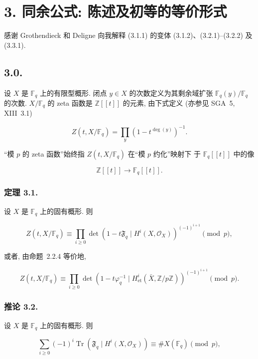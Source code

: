 \section*{3. 同余公式: 陈述及初等的等价形式}

感谢 Grothendieck 和 Deligne 向我解释 (3.1.1) 的变体
(3.1.2)、(3.2.1)--(3.2.2) 及 (3.3.1).

\subsection*{3.0.}
设 $X$ 是 $\mathbb F_q$ 上的有限型概形.
闭点 $y\in X$ 的次数定义为其剩余域扩张 $\mathbb F_q(y)/\mathbb F_q$ 的次数.
$X/\mathbb F_q$ 的 zeta 函数是 $\mathbb Z[[t]]$ 的元素,
由下式定义 (亦参见 SGA~5, XIII~3.1)

\begin{equation}\tag{3.0.1}
Z(t,X/\mathbb F_q)=\prod_y(1-t^{\deg(y)})^{-1}.
\end{equation}

“模 $p$ 的 zeta 函数”始终指 $Z(t,X/\mathbb F_q)$ 在“模 $p$ 约化”映射下
于 $\mathbb F_q[[t]]$ 中的像

\[
\mathbb Z[[t]]\longrightarrow\mathbb F_q[[t]].
\]

\subsubsection*{定理 3.1.}
设 $X$ 是 $\mathbb F_q$ 上的固有概形. 则

\begin{equation}\tag{3.1.1}
Z(t,X/\mathbb F_q)
\equiv
\prod_{i\geq0}
\det\!\left(1-t\mathfrak F_q\mid H^i(X,\mathcal O_X)\right)^{(-1)^{i+1}}
\pmod p,
\end{equation}

或者, 由命题~2.2.4 等价地,

\begin{equation}\tag{3.1.2}
Z(t,X/\mathbb F_q)
\equiv
\prod_{i\geq0}
\det\!\left(1-t\varphi_q^{-1}\mid
H^i_{\mathrm{et}}(\bar X,\mathbb Z/p\mathbb Z)\right)^{(-1)^{i+1}}
\pmod p.
\end{equation}

\subsubsection*{推论 3.2.}
设 $X$ 是 $\mathbb F_q$ 上的固有概形. 则

\begin{equation}\tag{3.2.1}
\sum_{i\geq0}(-1)^i
\operatorname{Tr}\!\left(\mathfrak F_q\mid H^i(X,\mathcal O_X)\right)
\equiv \#X(\mathbb F_q)\pmod p,
\end{equation}

